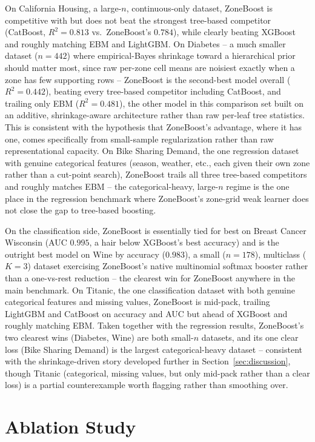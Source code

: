 \documentclass[11pt]{article}
\begin{document}
On California Housing, a large-$n$, continuous-only dataset, ZoneBoost is
competitive with but does not beat the strongest tree-based competitor
(CatBoost, $R^2=0.813$ vs.\ ZoneBoost's $0.784$), while clearly beating
XGBoost and roughly matching EBM and LightGBM. On Diabetes -- a much smaller
dataset ($n=442$) where empirical-Bayes shrinkage toward a hierarchical
prior should matter most, since raw per-zone cell means are noisiest exactly
when a zone has few supporting rows -- ZoneBoost is the second-best model
overall ($R^2=0.442$), beating every tree-based competitor including
CatBoost, and trailing only EBM ($R^2=0.481$), the other model in this
comparison set built on an additive, shrinkage-aware architecture rather
than raw per-leaf tree statistics. This is consistent with the hypothesis
that ZoneBoost's advantage, where it has one, comes specifically from
small-sample regularization rather than raw representational capacity. On
Bike Sharing Demand, the one regression dataset with genuine categorical
features (season, weather, etc., each given their own zone rather than a
cut-point search), ZoneBoost trails all three tree-based competitors and
roughly matches EBM -- the categorical-heavy, large-$n$ regime is the one
place in the regression benchmark where ZoneBoost's zone-grid weak learner
does not close the gap to tree-based boosting.

On the classification side, ZoneBoost is essentially tied for best on
Breast Cancer Wisconsin (AUC $0.995$, a hair below XGBoost's best accuracy)
and is the outright best model on Wine by accuracy ($0.983$), a small
($n=178$), multiclass ($K=3$) dataset exercising ZoneBoost's native
multinomial softmax booster rather than a one-vs-rest reduction -- the
clearest win for ZoneBoost anywhere in the main benchmark. On Titanic, the
one classification dataset with both genuine categorical features and
missing values, ZoneBoost is mid-pack, trailing LightGBM and CatBoost on
accuracy and AUC but ahead of XGBoost and roughly matching EBM. Taken
together with the regression results, ZoneBoost's two clearest wins
(Diabetes, Wine) are both small-$n$ datasets, and its one clear loss (Bike
Sharing Demand) is the largest categorical-heavy dataset -- consistent with
the shrinkage-driven story developed further in
Section~\ref{sec:discussion}, though Titanic (categorical, missing values,
but only mid-pack rather than a clear loss) is a partial counterexample
worth flagging rather than smoothing over.

\section{Ablation Study}
\label{sec:ablation}
\end{document}
